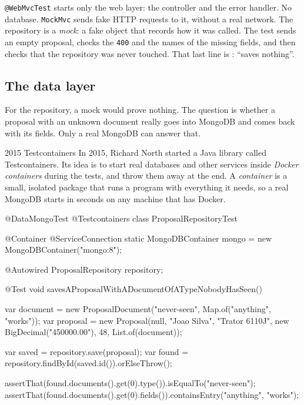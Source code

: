 \texttt{@WebMvcTest} starts only the web layer: the controller and the error
handler. No database. \texttt{MockMvc} sends fake HTTP requests to it, without
a real network. The repository is a \emph{mock}: a fake object that records
how it was called. The test sends an empty proposal, checks the \texttt{400}
and the names of the missing fields, and then checks that the repository was
never touched. That last line is : ``saves nothing''.

\subsection*{The data layer}

For the repository, a mock would prove nothing. The question is whether a
proposal with an unknown document really goes into MongoDB and comes back with
its fields. Only a real MongoDB can answer that.

\begin{history}{2015 \textperiodcentered{} Testcontainers}
In 2015, Richard North started a Java library called Testcontainers. Its idea
is to start real databases and other services inside \emph{Docker
containers} during the tests, and throw them away at the end. A
\emph{container} is a small, isolated package that runs a program with
everything it needs, so a real MongoDB starts in seconds on any machine that
has Docker.
\end{history}

\begin{code}
@DataMongoTest
@Testcontainers
class ProposalRepositoryTest {

    @Container
    @ServiceConnection
    static MongoDBContainer mongo = new MongoDBContainer("mongo:8");

    @Autowired
    ProposalRepository repository;

    @Test
    void savesAProposalWithADocumentOfATypeNobodyHasSeen() {
        var document = new ProposalDocument("never-seen", Map.of("anything", "works"));
        var proposal = new Proposal(null, "Joao Silva", "Trator 6110J",
                new BigDecimal("450000.00"), 48, List.of(document));

        var saved = repository.save(proposal);
        var found = repository.findById(saved.id()).orElseThrow();

        assertThat(found.documents().get(0).type()).isEqualTo("never-seen");
        assertThat(found.documents().get(0).fields()).containsEntry("anything", "works");
    }
}
\end{code}

